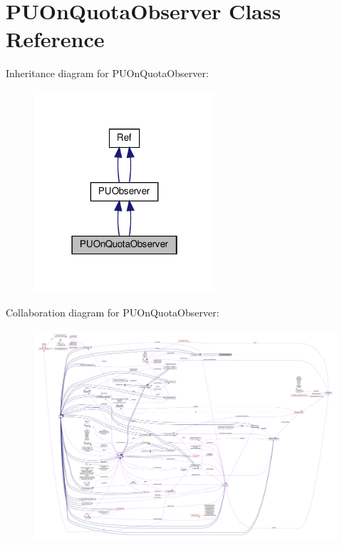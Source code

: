 \hypertarget{classPUOnQuotaObserver}{}\section{P\+U\+On\+Quota\+Observer Class Reference}
\label{classPUOnQuotaObserver}


Inheritance diagram for P\+U\+On\+Quota\+Observer\+:
\nopagebreak
\begin{figure}[H]
\begin{center}
\leavevmode
\includegraphics[width=190pt]{classPUOnQuotaObserver__inherit__graph}
\end{center}
\end{figure}


Collaboration diagram for P\+U\+On\+Quota\+Observer\+:
\nopagebreak
\begin{figure}[H]
\begin{center}
\leavevmode
\includegraphics[width=350pt]{classPUOnQuotaObserver__coll__graph}
\end{center}
\end{figure}
